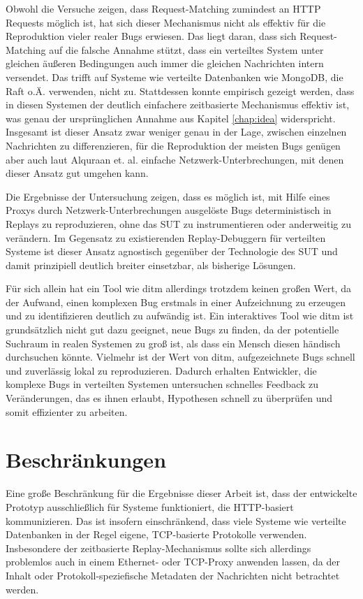 \documentclass[12pt,a4paper]{report}
\begin{document}
Obwohl die Versuche zeigen, dass Request-Matching zumindest an HTTP Requests möglich ist, hat sich dieser Mechanismus nicht als
effektiv für die Reproduktion vieler realer Bugs erwiesen. Das liegt daran, dass sich Request-Matching auf die falsche Annahme
stützt, dass ein verteiltes System unter gleichen äußeren Bedingungen auch immer die gleichen Nachrichten intern versendet. Das
trifft auf Systeme wie verteilte Datenbanken wie MongoDB, die Raft o.Ä. verwenden, nicht zu. Stattdessen konnte empirisch gezeigt
werden, dass in diesen Systemen der deutlich einfachere zeitbasierte Mechanismus effektiv ist, was genau der ursprünglichen
Annahme aus Kapitel \ref{chap:idea} widerspricht. Insgesamt ist dieser Ansatz zwar weniger genau in der Lage, zwischen einzelnen
Nachrichten zu differenzieren, für die Reproduktion der meisten Bugs genügen aber auch laut Alquraan et. al.
\cite{analysis_of_network_partition_failures} einfache Netzwerk-Unterbrechungen, mit denen dieser Ansatz gut umgehen kann.

Die Ergebnisse der Untersuchung zeigen, dass es möglich ist, mit Hilfe eines Proxys durch Netzwerk-Unterbrechungen
ausgelöste Bugs deterministisch in Replays zu reproduzieren, ohne das SUT zu instrumentieren oder anderweitig zu verändern.
Im Gegensatz zu existierenden Replay-Debuggern für verteilten Systeme ist dieser Ansatz agnostisch gegenüber der Technologie des
SUT und damit prinzipiell deutlich breiter einsetzbar, als bisherige Lösungen.

Für sich allein hat ein Tool wie ditm allerdings trotzdem keinen großen Wert, da der Aufwand, einen komplexen Bug erstmals in
einer Aufzeichnung zu erzeugen und zu identifizieren deutlich zu aufwändig ist. Ein interaktives Tool wie ditm ist grundsätzlich
nicht gut dazu geeignet, neue Bugs zu finden, da der potentielle Suchraum in realen Systemen zu groß ist, als dass ein Mensch
diesen händisch durchsuchen könnte. Vielmehr ist der Wert von ditm, aufgezeichnete Bugs schnell und zuverlässig lokal zu
reproduzieren. Dadurch erhalten Entwickler, die komplexe Bugs in verteilten Systemen untersuchen schnelles Feedback zu
Veränderungen, das es ihnen erlaubt, Hypothesen schnell zu überprüfen und somit effizienter zu arbeiten.

\section{Beschränkungen}
Eine große Beschränkung für die Ergebnisse dieser Arbeit ist, dass der entwickelte Prototyp ausschließlich für Systeme
funktioniert, die HTTP-basiert kommunizieren. Das ist insofern einschränkend, dass viele Systeme wie verteilte Datenbanken in der
Regel eigene, TCP-basierte Protokolle verwenden. Insbesondere der zeitbasierte Replay-Mechanismus sollte sich allerdings
problemlos auch in einem Ethernet- oder TCP-Proxy anwenden lassen, da der Inhalt oder Protokoll-speziefische Metadaten der
Nachrichten nicht betrachtet werden.
\end{document}
